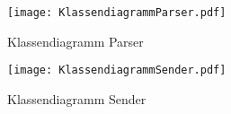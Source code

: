 \label{sec:klassendiagramme}

\begin{figure}[H]
\centering
\texttt{[image: KlassendiagrammParser.pdf]}
\caption{Klassendiagramm Parser}
\label{fig:KlassendiagrammParser}
\end{figure}

\newpage

\begin{figure}[H]
\centering
\texttt{[image: KlassendiagrammSender.pdf]}
\caption{Klassendiagramm Sender}
\label{fig:KlassendiagrammSender}
\end{figure}